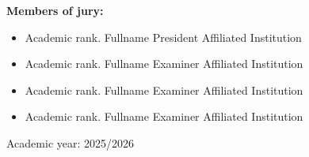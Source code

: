\begin{titlepage}
    \raggedright
    \textbf{Members of jury:}\\
    \begin{itemize}[leftmargin=2em]
        \item Academic rank. Fullname \hfill President \hfill Affiliated Institution
        \item Academic rank. Fullname \hfill Examiner \hfill Affiliated Institution
        \item Academic rank. Fullname \hfill Examiner \hfill Affiliated Institution
        \item Academic rank. Fullname \hfill Examiner \hfill Affiliated Institution
    \end{itemize}
    \vfill
    \centering
    Academic year: 2025/2026
\end{titlepage}
